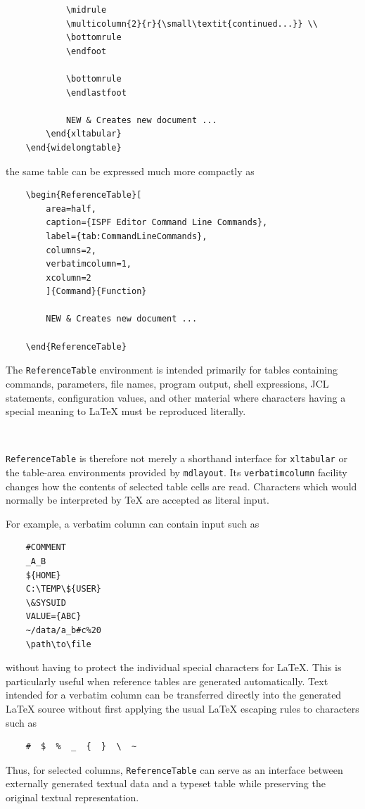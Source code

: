 \documentclass[
11pt,
a4paper,
oneside
]{scrbook}
\begin{document}
{\begin{verbatim}
			\midrule
			\multicolumn{2}{r}{\small\textit{continued...}} \\
			\bottomrule
			\endfoot
			
			\bottomrule
			\endlastfoot
			
			NEW & Creates new document ...
		\end{xltabular}
	\end{widelongtable}
\end{verbatim}

\noindent
the same table can be expressed much more compactly as

\begin{verbatim}
	\begin{ReferenceTable}[
		area=half,
		caption={ISPF Editor Command Line Commands},
		label={tab:CommandLineCommands},
		columns=2,
		verbatimcolumn=1,
		xcolumn=2
		]{Command}{Function}
		
		NEW & Creates new document ...
		
	\end{ReferenceTable}
\end{verbatim}
The \texttt{ReferenceTable} environment is intended primarily for tables
containing commands, parameters, file names, program output, shell
expressions, JCL statements, configuration values, and other material where
characters having a special meaning to \LaTeX{} must be reproduced literally.

\begin{SynchronizedMarginAndTextArea}
	\begin{TextInMarginArea}
		{\centering\mdSeeRight\\}
	\end{TextInMarginArea}
	\begin{TextInTextArea}
		\texttt{ReferenceTable} is therefore not merely a shorthand interface
		for \texttt{xltabular} or the table-area environments provided by
		\texttt{mdlayout}. Its \texttt{verbatimcolumn} facility changes how
		the contents of selected table cells are read. Characters which would
		normally be interpreted by \TeX{} are accepted as literal input.
	\end{TextInTextArea}
\end{SynchronizedMarginAndTextArea}
For example, a verbatim column can contain input such as
\begin{verbatim}
	#COMMENT
	_A_B
	${HOME}
	C:\TEMP\${USER}
	\&SYSUID
	VALUE={ABC}
	~/data/a_b#c%20
	\path\to\file
\end{verbatim}
without having to protect the individual special characters for \LaTeX{}.
This is particularly useful when reference tables are generated
automatically. Text intended for a verbatim column can be transferred
directly into the generated \LaTeX{} source without first applying the usual
\LaTeX{} escaping rules to characters such as
\begin{verbatim}
	#  $  %  _  {  }  \  ~
\end{verbatim}
Thus, for selected columns, \texttt{ReferenceTable} can serve as an interface
between externally generated textual data and a typeset table while
preserving the original textual representation.

}
\end{document}
